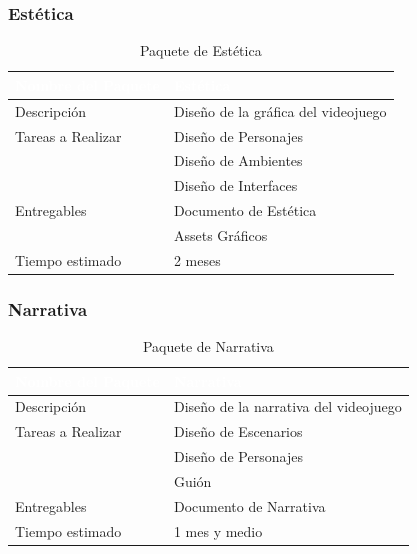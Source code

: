 \subsubsection{Estética}
\begin{table}[h!]
    \centering
    \begin{tabular}{|l|p{10cm}|}
        \hline
        \rowcolor{Orange}
        \textcolor{white}{\textbf{Nombre del Paquete}} & \textcolor{white}{\textbf{Estética}}\\
        \hline
        \rowcolor{Light Orange}
        Descripción & Diseño de la gráfica del videojuego\\
        \hline
        \rowcolor{Light Orange}
        Tareas a Realizar & Diseño de Personajes\\
        \rowcolor{Light Orange}
        & Diseño de Ambientes\\
        \rowcolor{Light Orange}
        & Diseño de Interfaces\\
        \hline
        \rowcolor{Light Orange}
        Entregables & Documento de Estética\\
        \rowcolor{Light Orange}
        & Assets Gráficos\\
        \hline
        \rowcolor{Light Orange}
        Tiempo estimado & 2 meses\\
        \hline
    \end{tabular}
    \caption{Paquete de Estética}
    \label{tab:paquete-estetica}
\end{table}

\newpage
\subsubsection{Narrativa}
\begin{table}[h!]
    \centering
    \begin{tabular}{|l|p{10cm}|}
        \hline
        \rowcolor{Blue}
        \textcolor{white}{\textbf{Nombre del Paquete}} & \textcolor{white}{\textbf{Narrativa}}\\
        \hline
        \rowcolor{Light Blue}
        Descripción & Diseño de la narrativa del videojuego\\
        \hline
        \rowcolor{Light Blue}
        Tareas a Realizar & Diseño de Escenarios\\
        \rowcolor{Light Blue}
        & Diseño de Personajes\\
        \rowcolor{Light Blue}
        & Guión\\
        \hline
        \rowcolor{Light Blue}
        Entregables & Documento de Narrativa\\
        \hline
        \rowcolor{Light Blue}
        Tiempo estimado & 1 mes y medio\\
        \hline
    \end{tabular}
    \caption{Paquete de Narrativa}
    \label{tab:paquete-narrativa}
\end{table}

